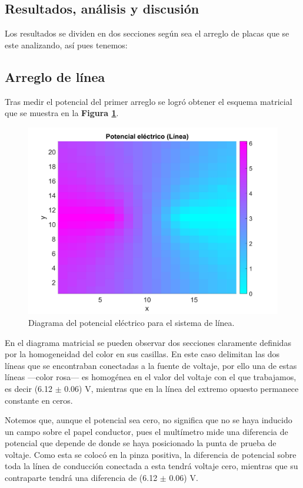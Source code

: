 \documentclass[letterpaper, 11 pt]{article}
\begin{document}
\begin{multicols}{2}
\section{Resultados, análisis y discusión}

Los resultados se dividen en dos secciones según sea el arreglo de placas que se este analizando, así pues tenemos:

\subsection*{Arreglo de línea}

Tras medir el potencial del primer arreglo se logró obtener el esquema matricial que se muestra en la \textbf{Figura \ref{campodipolo}}.

\begin{figure}[H]
    \captionsetup{justification=centering,margin=0.5cm}
    \includegraphics[scale=0.047]{dipolo.jpg}
    \centering
    \caption{Diagrama del potencial eléctrico para el sistema de línea.}
    \label{campodipolo}
\end{figure}

En el diagrama matricial se pueden observar dos secciones claramente definidas por la homogeneidad del color en sus casillas. En este caso delimitan las dos líneas que se encontraban conectadas a la fuente de voltaje, por ello una de estas líneas —color rosa— es homogénea en el valor del voltaje con el que trabajamos, es decir (6.12 $\pm$ 0.06) V, mientras que en la línea del extremo opuesto permanece constante en ceros. 

Notemos que, aunque el potencial sea cero, no significa que no se haya inducido un campo sobre el papel conductor, pues el multímetro mide una diferencia de potencial que depende de donde se haya posicionado la punta de prueba de voltaje. Como esta se colocó en la pinza positiva, la diferencia de potencial sobre toda la línea de conducción conectada a esta tendrá voltaje cero, mientras que su contraparte tendrá una diferencia de (6.12 $\pm$ 0.06) V.


\end{multicols}
\end{document}
